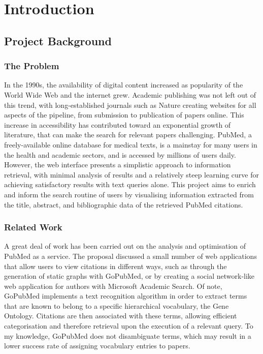 \documentclass[Report.tex]{subfiles}
\begin{document}
\chapter{Introduction}
\section{Project Background}
\subsection{The Problem}
In the 1990s, the availability of digital content increased as popularity of the World Wide Web and the internet grew. Academic publishing was not left out of this trend, with long-established journals such as Nature creating websites for all aspects of the pipeline, from submission to publication of papers online\cite{nature-history}. This increase in accessibility has contributed toward an exponential growth of literature\cite{hunter-cohen}, that can make the search for relevant papers challenging. PubMed, a freely-available online database for medical texts, is a mainstay for many users in the health and academic sectors, and is accessed by millions of users daily\cite{dogan}. However, the web interface presents a simplistic approach to information retrieval, with minimal analysis of results and a relatively steep learning curve for achieving satisfactory results with text queries alone. This project aims to enrich and inform the search routine of users by visualising information extracted from the title, abstract, and bibliographic data of the retrieved PubMed citations.

\subsection{Related Work}
A great deal of work has been carried out on the analysis and optimisation of PubMed as a service. The proposal discussed a small number of web applications that allow users to view citations in different ways, such as through the generation of static graphs with GoPubMed\cite{gopubmed}, or by creating a social network-like web application for authors with Microsoft Academic Search\cite{mas}. Of note, GoPubMed implements a text recognition algorithm in order to extract terms that are known to belong to a specific hierarchical vocabulary, the Gene Ontology. Citations are then associated with these terms, allowing efficient categorisation and therefore retrieval upon the execution of a relevant query. To my knowledge, GoPubMed does not disambiguate terms, which may result in a lower success rate of assigning vocabulary entries to papers.
\end{document}
